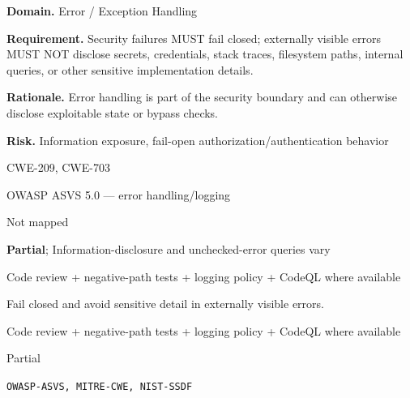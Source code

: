 \documentclass[10pt,letterpaper]{article}
\newcommand{\prioritybadge}[2]{\tcbox[on line,boxrule=0pt,arc=1.2mm,boxsep=0.7mm,left=1mm,right=1mm,top=0.4mm,bottom=0.4mm,colback=#2!12,coltext=#2]{\scriptsize\bfseries #1}}
\begin{document}
\begin{rulebox}[title={\texttt{SCS-ALL-ERROR-001} \hfill \prioritybadge{High Priority}{High}}]
\textbf{Domain.} Error / Exception Handling

\textbf{Requirement.} Security failures MUST fail closed; externally visible errors MUST NOT disclose secrets, credentials, stack traces, filesystem paths, internal queries, or other sensitive implementation details.

\textbf{Rationale.} Error handling is part of the security boundary and can otherwise disclose exploitable state or bypass checks.

\textbf{Risk.} Information exposure, fail-open authorization/authentication behavior

\begin{description}[leftmargin=2.65cm,labelwidth=2.3cm,style=nextline,itemsep=1pt,topsep=3pt]
  \item[CWE] CWE-209, CWE-703
  \item[OWASP] OWASP ASVS 5.0 --- error handling/logging
  \item[CERT] Not mapped
  \item[CodeQL] \textbf{Partial}; Information-disclosure and unchecked-error queries vary
  \item[Enforcement] Code review + negative-path tests + logging policy + CodeQL where available
  \item[Prevention] Fail closed and avoid sensitive detail in externally visible errors.
  \item[Verification] Code review + negative-path tests + logging policy + CodeQL where available
  \item[Automation] Partial
  \item[Sources] \texttt{OWASP-ASVS, MITRE-CWE, NIST-SSDF}
\end{description}
\end{rulebox}
\end{document}
